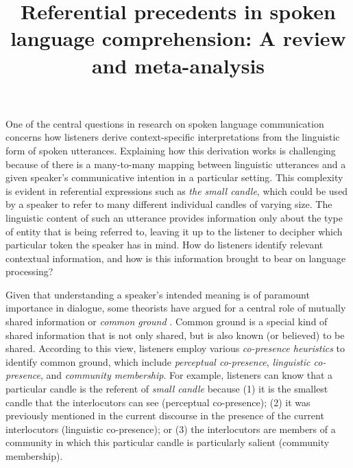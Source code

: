 \documentclass[doc,fignum,apacite,floatsintext]{apa6}
\title{Referential precedents in spoken language comprehension: A review and meta-analysis}
\begin{document}
\maketitle

\clearpage

One of the central questions in research on spoken language communication concerns how listeners derive context-specific interpretations from the linguistic form of spoken utterances.  Explaining how this derivation works is challenging because of there is a many-to-many mapping between linguistic utterances and a given speaker's communicative intention in a particular setting.  This complexity is evident in referential expressions such as \textit{the small candle}, which could be used by a speaker to refer to many different individual candles of varying size.  The linguistic content of such an utterance provides information only about the type of entity that is being referred to, leaving it up to the listener to decipher which particular token the speaker has in mind.  How do listeners identify relevant contextual information, and how is this information brought to bear on language processing?

Given that understanding a speaker's intended meaning is of paramount importance in dialogue, some theorists have argued for a central role of mutually shared information or \textit{common ground} \cite{clarkcarlson81,clarkmarshall81}.  Common ground is a special kind of shared information that is not only shared, but is also known (or believed) to be shared.  According to this view, listeners employ various \textit{co-presence heuristics} to identify common ground, which include \textit{perceptual co-presence}, \textit{linguistic co-presence}, and \textit{community membership}.  For example, listeners can know that a particular candle is the referent of \textit{small candle} because (1) it is the smallest candle that the interlocutors can see (perceptual co-presence); (2) it was previously mentioned in the current discourse in the presence of the current interlocutors (linguistic co-presence); or (3) the interlocutors are members of a community in which this particular candle is particularly salient (community membership).
\end{document}
